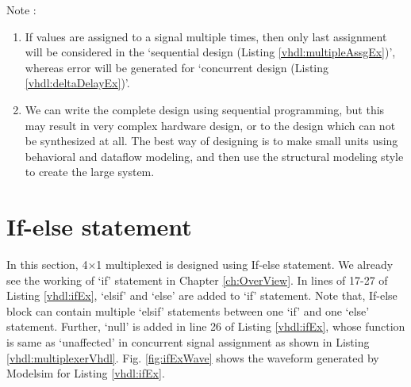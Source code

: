 \begin{noNumBox}
	Note :
	\begin{enumerate}
		\item If values are assigned to a signal multiple times, then only last assignment will be considered in the `sequential design (Listing \ref{vhdl:multipleAssgEx})', whereas error will be generated for `concurrent design (Listing \ref{vhdl:deltaDelayEx})'. 
		\item We can write the complete design using sequential programming, but this may result in very complex hardware design, or to the design which can not be synthesized at all. The best way of designing is to make small units using behavioral and dataflow modeling, and then use the structural modeling style to create the large system. 
	\end{enumerate}
\end{noNumBox}

\section{If-else statement}
In this section, 4$\times$1 multiplexed is designed using If-else statement. We already see the working of `if' statement in Chapter \ref{ch:OverView}. In lines of 17-27 of Listing \ref{vhdl:ifEx}, `elsif' and `else' are added to `if' statement. Note that, If-else block can contain multiple `elsif' statements between one `if' and one `else' statement. Further, `null' is added in line 26 of Listing \ref{vhdl:ifEx}, whose function is same as `unaffected' in concurrent signal assignment as shown in Listing \ref{vhdl:multiplexerVhdl}. Fig. \ref{fig:ifExWave} shows the waveform generated by Modelsim for Listing \ref{vhdl:ifEx}. 

